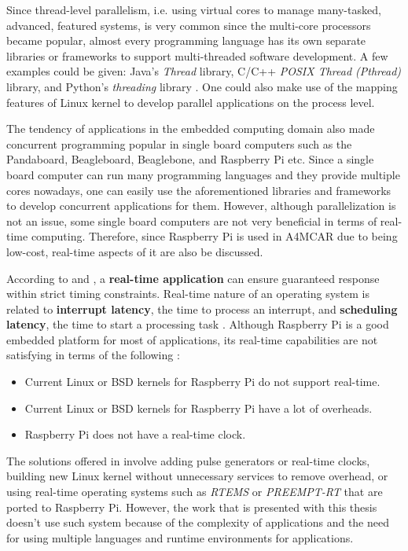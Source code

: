 Since thread-level parallelism, i.e. using virtual cores to manage many-tasked, advanced, featured systems, is very common since the multi-core processors became popular, almost every programming language has its own separate libraries or frameworks to support multi-threaded software development. A few examples could be given: Java's \textit{Thread} library, C/C++ \textit{POSIX Thread (Pthread)} library, and Python's \textit{threading} library \cite{pythonthreading}. One could also make use of the mapping features of Linux kernel to develop parallel applications on the process level.

The tendency of applications in the embedded computing domain also made concurrent programming popular in single board computers such as the Pandaboard, Beagleboard, Beaglebone, and Raspberry Pi etc. Since a single board computer can run many programming languages and they provide multiple cores nowadays, one can easily use the aforementioned libraries and frameworks to develop concurrent applications for them. However, although parallelization is not an issue, some single board computers are not very beneficial in terms of real-time computing. Therefore, since Raspberry Pi is used in A4MCAR due to being low-cost, real-time aspects of it are also be discussed.

According to \cite{rtrpi1} and \cite{rtrpi2}, a \textbf{real-time application} can ensure guaranteed response within strict timing constraints. Real-time nature of an operating system is related to \textbf{interrupt latency}, the time to process an interrupt, and \textbf{scheduling latency}, the time to start a processing task \cite{rtrpi2}. Although Raspberry Pi is a good embedded platform for most of applications, its real-time capabilities are not satisfying in terms of the following \cite{rtrpi2}:
\begin{itemize}
	\item Current Linux or BSD kernels for Raspberry Pi do not support real-time.
	\item Current Linux or BSD kernels for Raspberry Pi have a lot of overheads.
	\item Raspberry Pi does not have a real-time clock. 
\end{itemize}

The solutions offered in \cite{rtrpi2} involve adding pulse generators or real-time clocks, building new Linux kernel without unnecessary services to remove overhead, or using real-time operating systems such as \textit{RTEMS} or \textit{PREEMPT-RT} that are ported to Raspberry Pi. However, the work that is presented with this thesis doesn't use such system because of the complexity of applications and the need for using multiple languages and runtime environments for applications.

